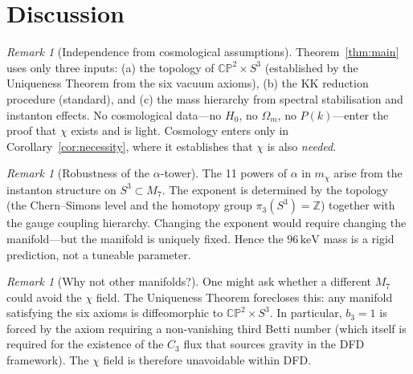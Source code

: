 \documentclass[12pt,a4paper]{article}
\theoremstyle{definition}
\theoremstyle{remark}
\newtheorem{remark}[theorem]{Remark}
\newcommand{\CP}{\mathbb{CP}}
\newcommand{\keV}{\,\mathrm{keV}}
\begin{document}
\section{Discussion}

\begin{remark}[Independence from cosmological assumptions]
Theorem~\ref{thm:main} uses only three inputs: (a) the topology of
$\CP^2 \times S^3$ (established by the Uniqueness Theorem from the
six vacuum axioms), (b) the KK reduction procedure (standard), and
(c) the mass hierarchy from spectral stabilisation and instanton effects.
No cosmological data---no $H_0$, no $\Omega_m$, no $P(k)$---enter the
proof that $\chi$ exists and is light.  Cosmology enters only in
Corollary~\ref{cor:necessity}, where it establishes that $\chi$ is
also \emph{needed}.
\end{remark}

\begin{remark}[Robustness of the $\alpha$-tower]
The 11 powers of $\alpha$ in $m_\chi$ arise from the instanton
structure on $S^3 \subset M_7$.  The exponent is determined by the
topology (the Chern--Simons level and the homotopy group
$\pi_3(S^3) = \mathbb{Z}$) together with the gauge coupling hierarchy.
Changing the exponent would require changing the manifold---but the
manifold is uniquely fixed.  Hence the $96\keV$ mass is a rigid
prediction, not a tuneable parameter.
\end{remark}

\begin{remark}[Why not other manifolds?]
One might ask whether a different $M_7$ could avoid the $\chi$ field.
The Uniqueness Theorem forecloses this: any manifold satisfying the six
axioms is diffeomorphic to $\CP^2 \times S^3$.  In particular,
$b_3 = 1$ is forced by the axiom requiring a non-vanishing third Betti
number (which itself is required for the existence of the $C_3$ flux
that sources gravity in the DFD framework).  The $\chi$ field is
therefore unavoidable within DFD.
\end{remark}
\end{document}
